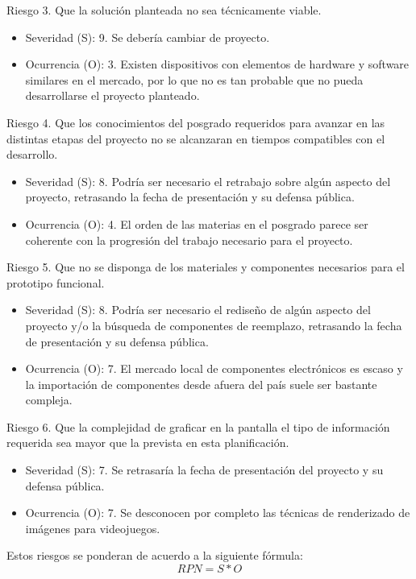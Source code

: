 \documentclass[
11pt, %
]{charter}
\begin{document}
Riesgo 3. Que la solución planteada no sea técnicamente viable.
\begin{itemize}
	\item Severidad (S): 9. Se debería cambiar de proyecto.
	\item Ocurrencia (O): 3. Existen dispositivos con elementos de hardware y software similares en el mercado, por lo que no es tan probable que no pueda desarrollarse el proyecto planteado.
\end{itemize}

Riesgo 4. Que los conocimientos del posgrado requeridos para avanzar en las distintas etapas del proyecto no se alcanzaran en tiempos compatibles con el desarrollo.
\begin{itemize}
	\item Severidad (S): 8. Podría ser necesario el retrabajo sobre algún aspecto del proyecto, retrasando la fecha de presentación y su defensa pública.
	\item Ocurrencia (O): 4. El orden de las materias en el posgrado parece ser coherente con la progresión del trabajo necesario para el proyecto.
\end{itemize}

Riesgo 5. Que no se disponga de los materiales y componentes necesarios para el prototipo funcional.
\begin{itemize}
	\item Severidad (S): 8. Podría ser necesario el rediseño de algún aspecto del proyecto y/o la búsqueda de componentes de reemplazo, retrasando la fecha de presentación y su defensa pública.
	\item Ocurrencia (O): 7. El mercado local de componentes electrónicos es escaso y la importación de componentes desde afuera del país suele ser bastante compleja.
\end{itemize}

Riesgo 6. Que la complejidad de graficar en la pantalla el tipo de información requerida sea mayor que la prevista en esta planificación.
\begin{itemize}
	\item Severidad (S): 7. Se retrasaría la fecha de presentación del proyecto y su defensa pública.
	\item Ocurrencia (O): 7. Se desconocen por completo las técnicas de renderizado de imágenes para videojuegos.
\end{itemize}


Estos riesgos se ponderan de acuerdo a la siguiente fórmula:
\[RP N = S * O\]
\end{document}
